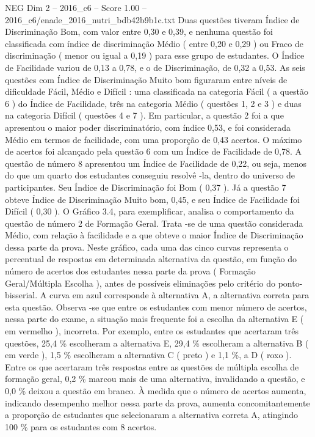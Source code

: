 \begin{textsample}{NEG Dim 2 – 2016\_c6 – Score 1.00 – 2016\_c6/enade\_2016\_nutri\_bdb42b9b1c.txt}
Duas questões tiveram Índice de Discriminação Bom, com valor entre 0,30 e 0,39, e nenhuma questão foi classificada com índice de discriminação Médio ( entre 0,20 e 0,29 ) ou Fraco de discriminação ( menor ou igual a 0,19 ) para esse grupo de estudantes.
O Índice de Facilidade variou de 0,13 a 0,78, e o de Discriminação, de 0,32 a 0,53.
As seis questões com Índice de Discriminação Muito bom figuraram entre níveis de dificuldade Fácil, Médio e Difícil : uma classificada na categoria Fácil ( a questão 6 ) do Índice de Facilidade, três na categoria Médio ( questões 1, 2 e 3 ) e duas na categoria Difícil ( questões 4 e 7 ).
Em particular, a questão 2 foi a que apresentou o maior poder discriminatório, com índice 0,53, e foi considerada Médio em termos de facilidade, com uma proporção de 0,43 acertos.
O máximo de acertos foi alcançado pela questão 6 com um Índice de Facilidade de 0,78.
A questão de número 8 apresentou um Índice de Facilidade de 0,22, ou seja, menos do que um quarto dos estudantes conseguiu resolvê -la, dentro do universo de participantes.
Seu Índice de Discriminação foi Bom ( 0,37 ).
Já a questão 7 obteve Índice de Discriminação Muito bom, 0,45, e seu Índice de Facilidade foi Difícil ( 0,30 ).
O Gráfico 3.4, para exemplificar, analisa o comportamento da questão de número 2 de Formação Geral.
Trata -se de uma questão considerada Médio, com relação à facilidade e a que obteve o maior Índice de Discriminação dessa parte da prova.
Neste gráfico, cada uma das cinco curvas representa o percentual de respostas em determinada alternativa da questão, em função do número de acertos dos estudantes nessa parte da prova ( Formação Geral/Múltipla Escolha ), antes de possíveis eliminações pelo critério do ponto-bisserial.
A curva em azul corresponde à alternativa A, a alternativa correta para esta questão.
Observa -se que entre os estudantes com menor número de acertos, nessa parte do exame, a situação mais frequente foi a escolha da alternativa E ( em vermelho ), incorreta.
Por exemplo, entre os estudantes que acertaram três questões, 25,4 \% escolheram a alternativa E, 29,4 \% escolheram a alternativa B ( em verde ), 1,5 \% escolheram a alternativa C ( preto ) e 1,1 \%, a D ( roxo ).
Entre os que acertaram três respostas entre as questões de múltipla escolha de formação geral, 0,2 \% marcou mais de uma alternativa, invalidando a questão, e 0,0 \% deixou a questão em branco.
À medida que o número de acertos aumenta, indicando desempenho melhor nessa parte da prova, aumenta concomitantemente a proporção de estudantes que selecionaram a alternativa correta A, atingindo 100 \% para os estudantes com 8 acertos.

\end{textsample}
